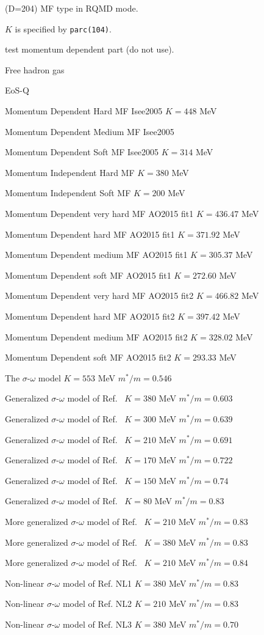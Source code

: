 \documentclass[]{article}
\newenvironment{entry}%
{\begin{list}{}{\setlength{\topsep}{0mm} \setlength{\itemsep}{0mm}
\setlength{\parskip}{0mm} \setlength{\parsep}{0mm}
\setlength{\leftmargin}{20mm} \setlength{\rightmargin}{0mm}
\setlength{\labelwidth}{18mm} \setlength{\labelsep}{2mm}}}%
{\end{list}}
\newenvironment{subentry}%
{\begin{list}{}{\setlength{\topsep}{0mm} \setlength{\itemsep}{0mm}
\setlength{\parskip}{0mm} \setlength{\parsep}{0mm}
\setlength{\leftmargin}{10mm} \setlength{\rightmargin}{0mm}
\setlength{\labelwidth}{18mm} \setlength{\labelsep}{2mm}}}%
{\end{list}}
\newcommand{\ttt}[1]{{\tt#1}}
\newcommand{\itemt}[1]{\item[{\tt #1}\hfill]}
\begin{document}
\begin{entry}
\itemt{mstc(106) :}(D=204) MF type in RQMD mode.
 \begin{subentry}
    \itemt{$=-3$ :} $K$ is specified by \ttt{parc(104)}.
    \itemt{$=-2$ :} test momentum dependent part (do not use).
    \itemt{$=-1$ :} Free hadron gas
    \itemt{$=0$ :} EoS-Q
    \itemt{$=1$ :} Momentum Dependent Hard MF  Isee2005 $K=448$ MeV
    \itemt{$=2$ :} Momentum Dependent Medium MF  Isee2005 
    \itemt{$=3$ :} Momentum Dependent Soft MF  Isee2005 $K=314$ MeV
    \itemt{$=4$ :} Momentum Independent Hard MF  $K=380$ MeV
    \itemt{$=5$ :} Momentum Independent Soft MF  $K=200$ MeV
    \itemt{$=11$ :} Momentum Dependent very hard MF AO2015 fit1 $K=436.47$ MeV
    \itemt{$=12$ :} Momentum Dependent hard MF AO2015 fit1 $K=371.92$ MeV
    \itemt{$=13$ :} Momentum Dependent medium MF AO2015 fit1 $K=305.37$ MeV
    \itemt{$=14$ :} Momentum Dependent soft MF AO2015 fit1 $K=272.60$ MeV
    \itemt{$=21$ :} Momentum Dependent very hard MF AO2015 fit2 $K=466.82$ MeV
    \itemt{$=22$ :} Momentum Dependent hard MF AO2015 fit2 $K=397.42$ MeV
    \itemt{$=23$ :} Momentum Dependent medium MF AO2015 fit2 $K=328.02$ MeV
    \itemt{$=24$ :} Momentum Dependent soft MF AO2015 fit2 $K=293.33$ MeV
    \itemt{$=101$ :} The $\sigma$-$\omega$ model $K=553$ MeV $m^*/m=0.546$
    \itemt{$=102$ :} Generalized $\sigma$-$\omega$ model of
      Ref.~\cite{Gorenstein} $K=380$ MeV $m^*/m=0.603$
    \itemt{$=103$ :} Generalized $\sigma$-$\omega$ model of
      Ref.~\cite{Gorenstein} $K=300$ MeV $m^*/m=0.639$
    \itemt{$=104$ :} Generalized $\sigma$-$\omega$ model of
      Ref.~\cite{Gorenstein} $K=210$ MeV $m^*/m=0.691$
    \itemt{$=105$ :} Generalized $\sigma$-$\omega$ model of
      Ref.~\cite{Gorenstein} $K=170$ MeV $m^*/m=0.722$
    \itemt{$=106$ :} Generalized $\sigma$-$\omega$ model of
      Ref.~\cite{Gorenstein} $K=150$ MeV $m^*/m=0.74$
    \itemt{$=107$ :} Generalized $\sigma$-$\omega$ model of
      Ref.~\cite{Gorenstein} $K=80$ MeV $m^*/m=0.83$
    \itemt{$=108$ :} More generalized $\sigma$-$\omega$ model of
      Ref.~\cite{Gorenstein} $K=210$ MeV $m^*/m=0.83$
    \itemt{$=109$ :} More generalized $\sigma$-$\omega$ model of
      Ref.~\cite{Gorenstein} $K=380$ MeV $m^*/m=0.83$
    \itemt{$=110$ :} More generalized $\sigma$-$\omega$ model of
      Ref.~\cite{Gorenstein} $K=210$ MeV $m^*/m=0.84$

    \itemt{$=111$ :} Non-linear $\sigma$-$\omega$ model of Ref.\cite{Lang} NL1
        $K=380$ MeV $m^*/m=0.83$
    \itemt{$=112$ :} Non-linear $\sigma$-$\omega$ model of Ref.\cite{Lang}  NL2
         $K=210$ MeV $m^*/m=0.83$
    \itemt{$=113$ :} Non-linear $\sigma$-$\omega$ model of Ref.\cite{Lang}  NL3
        $K=380$ MeV $m^*/m=0.70$


\end{subentry}
\end{entry}
\end{document}
